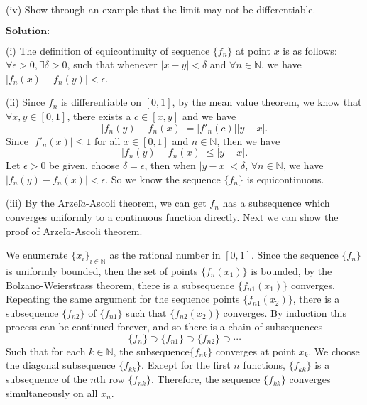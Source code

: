 \documentclass[12pt,a4paper]{ctexart}
\begin{document}
(iv) Show through an example that the limit may not be differentiable.

\vspace{8pt}
$\textbf{Solution:}$

(i) The definition of equicontinuity of sequence $\{f_{n}\}$ at point $x$ is as follows: $\forall \epsilon > 0, \exists \delta > 0$, such that whenever $|x - y| < \delta$ and $\forall n \in \mathbb{N}$, we have $|f_{n}(x) - f_{n}(y)| < \epsilon$.

(ii) Since $f_{n}$ is differentiable on $[0, 1]$, by the mean value theorem, we know that $\forall x, y \in [0, 1]$, there exists a $c \in [x, y]$ and we have
\begin{equation*}
   |f_{n}(y) - f_{n}(x)| = |f'_{n}(c)| |y - x|.
\end{equation*}
Since $|f'_{n}(x)| \leq 1$ for all $x \in [0, 1]$ and $n \in \mathbb{N}$, then we have
\begin{equation*}
   |f_{n}(y) - f_{n}(x)| \leq |y - x|.
\end{equation*}
Let $\epsilon > 0$ be given, choose $\delta = \epsilon$, then when $|y - x| < \delta$, $\forall n \in \mathbb{N}$, we have $|f_{n}(y) - f_{n}(x)| < \epsilon$. So we know the sequence $\{f_{n}\}$ is equicontinuous.

(iii) By the Arzel$\grave{a}$-Ascoli theorem, we can get $f_{n}$ has a subsequence which converges uniformly to a continuous function directly. Next we can show the proof of Arzel$\grave{a}$-Ascoli theorem.

We enumerate $\{x_{i}\}_{i \in \mathbb{N}}$ as the rational number in $[0, 1]$. Since the sequence $\{f_{n}\}$ is uniformly bounded, then the set of points $\{f_{n}(x_{1})\}$ is bounded, by the Bolzano-Weierstrass theorem, there is a subsequence $\{f_{n1}(x_{1})\}$ converges. Repeating the same argument for the sequence points $\{f_{n1}(x_{2})\}$, there is a subsequence $\{f_{n2}\}$ of $\{f_{n1}\}$ such that $\{f_{n2}(x_{2})\}$ converges. By induction this process can be continued forever, and so there is a chain of subsequences
\begin{equation*}
   \{f_{n}\} \supset \{f_{n1}\} \supset \{f_{n2}\} \supset \cdots
\end{equation*}
Such that for each $k \in \mathbb{N}$, the subsequence$\{f_{nk}\}$ converges at point $x_{k}$. We choose the diagonal subsequence $\{f_{kk}\}$. Except for the first $n$ functions, $\{f_{kk}\}$ is a subsequence of the $n$th row $\{f_{nk}\}$. Therefore, the sequence $\{f_{kk}\}$ converges simultaneously on all $x_{n}$.
\end{document}

